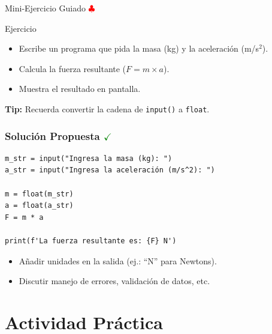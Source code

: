 \documentclass[10pt]{beamer}
\begin{document}
\begin{frame}{Mini-Ejercicio Guiado \hfill \textcolor{red}{$\clubsuit$}}
\begin{block}{Ejercicio}
  \begin{itemize}
    \item Escribe un programa que pida la masa (kg) y la aceleración (m/s\(^2\)).
    \item Calcula la fuerza resultante (\(F = m \times a\)).
    \item Muestra el resultado en pantalla.
  \end{itemize}
\end{block}
\textbf{Tip:} Recuerda convertir la cadena de \texttt{input()} a \texttt{float}.
\end{frame}


\begin{frame}[fragile]
\frametitle{Solución Propuesta \hfill \textcolor{green}{$\checkmark$}}
\begin{verbatim}
m_str = input("Ingresa la masa (kg): ")
a_str = input("Ingresa la aceleración (m/s^2): ")

m = float(m_str)
a = float(a_str)
F = m * a

print(f'La fuerza resultante es: {F} N')
\end{verbatim}
\begin{itemize}
  \item Añadir unidades en la salida (ej.: “N” para Newtons).
  \item Discutir manejo de errores, validación de datos, etc.
\end{itemize}
\end{frame}



\section{Actividad Práctica}
\end{document}
